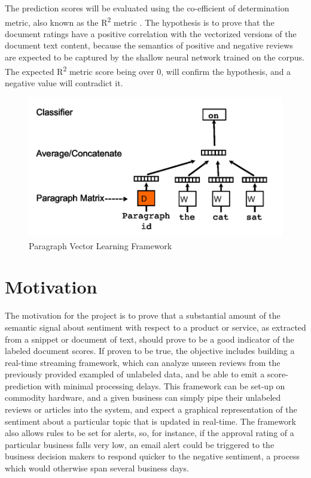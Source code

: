 \documentclass[conference]{IEEEtran}
\begin{document}
    The prediction scores will be evaluated using the co-efficient of determination metric, also known as the R\textsuperscript{2} metric \cite{cameron1997r}. 
    The hypothesis is to prove that the document ratings have a positive correlation with the vectorized versions of the document text content, because the semantics of positive and negative reviews are expected to be captured by the shallow neural network trained on the corpus.
    The expected R\textsuperscript{2} metric score being over 0, will confirm the hypothesis, and a negative value will contradict it.

\begin{figure}[ht] \label{fig:paragraph-vector-framework}
    \centering
    \includegraphics[width=400pt]{images/docvec_1.png}
    \caption{Paragraph Vector Learning Framework\cite{mikolov2013distributed}}
\end{figure}

\vspace{5mm}

\section{Motivation}
    The motivation for the project is to prove that a substantial amount of the semantic signal about sentiment with respect to a product or service, as extracted from a snippet or document of text, should prove to be a good indicator of the labeled document scores. 
    If proven to be true, the objective includes building a real-time streaming framework, which can analyze unseen reviews from the previously provided exampled of unlabeled data, and be able to emit a score-prediction with minimal processing delays.
    This framework can be set-up on commodity hardware, and a given business can simply pipe their unlabeled reviews or articles into the system, and expect a graphical representation of the sentiment about a particular topic that is updated in real-time. 
    The framework also allows rules to be set for alerts, so, for instance, if the approval rating of a particular business falls very low, an email alert could be triggered to the business decision makers to respond quicker to the negative sentiment, a process which would otherwise span several business days.
\end{document}
